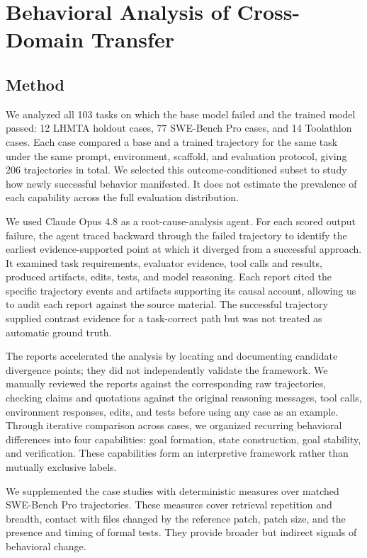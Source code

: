 \documentclass{article}
\begin{document}
\section{Behavioral Analysis of Cross-Domain Transfer}
\label{sec:analysis}

\subsection{Method}
\label{sec:method}

We analyzed all 103 tasks on which the base model failed and the trained model passed: 12 LHMTA holdout cases, 77 SWE-Bench Pro cases, and 14 Toolathlon cases. Each case compared a base and a trained trajectory for the same task under the same prompt, environment, scaffold, and evaluation protocol, giving 206 trajectories in total. We selected this outcome-conditioned subset to study how newly successful behavior manifested. It does not estimate the prevalence of each capability across the full evaluation distribution.

We used Claude Opus 4.8 as a root-cause-analysis agent. For each scored output failure, the agent traced backward through the failed trajectory to identify the earliest evidence-supported point at which it diverged from a successful approach. It examined task requirements, evaluator evidence, tool calls and results, produced artifacts, edits, tests, and model reasoning. Each report cited the specific trajectory events and artifacts supporting its causal account, allowing us to audit each report against the source material. The successful trajectory supplied contrast evidence for a task-correct path but was not treated as automatic ground truth.

The reports accelerated the analysis by locating and documenting candidate divergence points; they did not independently validate the framework. We manually reviewed the reports against the corresponding raw trajectories, checking claims and quotations against the original reasoning messages, tool calls, environment responses, edits, and tests before using any case as an example. Through iterative comparison across cases, we organized recurring behavioral differences into four capabilities: goal formation, state construction, goal stability, and verification. These capabilities form an interpretive framework rather than mutually exclusive labels.

We supplemented the case studies with deterministic measures over matched SWE-Bench Pro trajectories. These measures cover retrieval repetition and breadth, contact with files changed by the reference patch, patch size, and the presence and timing of formal tests. They provide broader but indirect signals of behavioral change.
\end{document}
